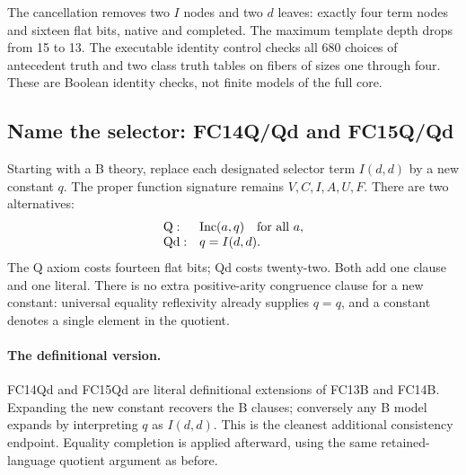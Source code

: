 The cancellation removes two $I$ nodes and two $d$ leaves: exactly four term
nodes and sixteen flat bits, native and completed.  The maximum template depth
drops from 15 to 13.  The executable identity control checks all 680 choices
of antecedent truth and two class truth tables on fibers of sizes one through
four.  These are Boolean identity checks, not finite models of the full core.

\subsection{Name the selector: FC14Q/Qd and FC15Q/Qd}

Starting with a B theory, replace each designated selector term $I(d,d)$ by a
new constant $q$.  The proper function signature remains
$V,C,I,A,U,F$.  There are two alternatives:
\[
 \begin{array}{ll}
 \mathrm{Q}:& \operatorname{Inc}(a,q)\quad\hbox{for all }a,\\
 \mathrm{Qd}:&q=I(d,d).
 \end{array}
\]
The Q axiom costs fourteen flat bits; Qd costs twenty-two.  Both add one clause
and one literal.  There is no extra positive-arity congruence clause for a new
constant: universal equality reflexivity already supplies $q=q$, and a
constant denotes a single element in the quotient.

\paragraph{The definitional version.}
FC14Qd and FC15Qd are literal definitional extensions of FC13B and FC14B.
Expanding the new constant recovers the B clauses; conversely any B model
expands by interpreting $q$ as $I(d,d)$.  This is the cleanest additional
consistency endpoint.  Equality completion is applied afterward, using the
same retained-language quotient argument as before.

